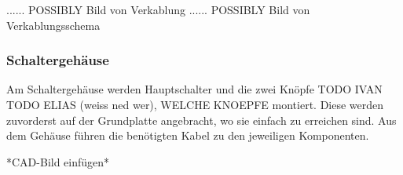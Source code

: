 ...... POSSIBLY Bild von Verkablung
...... POSSIBLY Bild von Verkablungsschema

\subsubsection{Schaltergehäuse}

Am Schaltergehäuse werden Hauptschalter und die zwei Knöpfe TODO IVAN TODO ELIAS (weiss ned wer), WELCHE KNOEPFE montiert. Diese werden zuvorderst auf der Grundplatte angebracht, wo sie einfach zu erreichen sind. Aus dem Gehäuse führen die benötigten Kabel zu den jeweiligen Komponenten.



*CAD-Bild einfügen*

